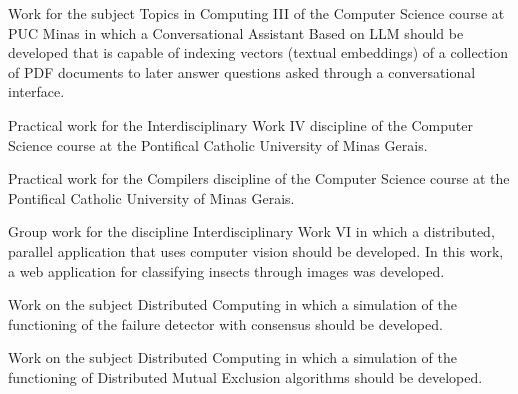 
Work for the subject Topics in Computing III of the Computer Science course at PUC Minas in which a Conversational Assistant Based on LLM should be developed that is capable of indexing vectors (textual embeddings) of a collection of PDF documents to later answer questions asked through a conversational interface.
\divider

Practical work for the Interdisciplinary Work IV discipline of the Computer Science course at the Pontifical Catholic University of Minas Gerais.
\divider

Practical work for the Compilers discipline of the Computer Science course at the Pontifical Catholic University of Minas Gerais.\\
\divider

Group work for the discipline Interdisciplinary Work VI in which a distributed, parallel application that uses computer vision should be developed. In this work, a web application for classifying insects through images was developed.\\
\divider

Work on the subject Distributed Computing in which a simulation of the functioning of the failure detector with consensus should be developed.\\
\divider

Work on the subject Distributed Computing in which a simulation of the functioning of Distributed Mutual Exclusion algorithms should be developed.\\
\divider

